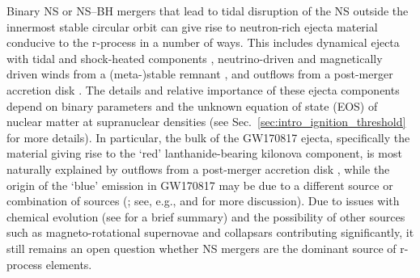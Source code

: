 Binary NS or NS--BH mergers that lead to tidal disruption of the NS outside the innermost stable circular orbit can give rise to neutron-rich ejecta material conducive to the r-process in a number of ways. This includes dynamical ejecta with tidal and shock-heated components \cite{ruffert_coalescing_1997-1,rosswog_mass_1999,oechslin_relativistic_2007,hotokezaka_mass_2013,hotokezaka_progenitor_2013}, neutrino-driven and magnetically driven winds from a (meta-)stable remnant \cite{dessart_neutrino_2009,siegel_magnetically_2014,ciolfi_general_2017,ciolfi_first_2019}, and outflows from a post-merger accretion disk \cite{fernandez_delayed_2013,just_comprehensive_2015,siegel_three-dimensional_2017}. The details and relative importance of these ejecta components depend on binary parameters and the unknown equation of state (EOS) of nuclear matter at supranuclear densities (see Sec.~\ref{sec:intro_ignition_threshold} for more details). In particular, the bulk of the GW170817 ejecta, specifically the material giving rise to the `red' lanthanide-bearing kilonova component, is most naturally explained by outflows from a post-merger accretion disk \cite{Kasen:2017sxr,siegel_three-dimensional_2017}, while the origin of the `blue' emission in GW170817 may be due to a different source or combination of sources (\cite{siegel_three-dimensional_2018,fernandez_long-term_2019,miller_full_2019-1,nedora_spiral-wave_2019,metzger_magnetar_2018,Ciolfi:2020wfx}; see, e.g., \cite{metzger_kilonovae_2019} and \cite{Siegel:2019mlp} for more discussion). Due to issues with chemical evolution (see \cite{Siegel:2019mlp} for a brief summary) and the possibility of other sources such as magneto-rotational supernovae \cite{winteler_magnetorotationally_2012,halevi_r-process_2018} and collapsars \cite{siegel_collapsars_2019} contributing significantly, it still remains an open question whether NS mergers are the dominant source of r-process elements.

